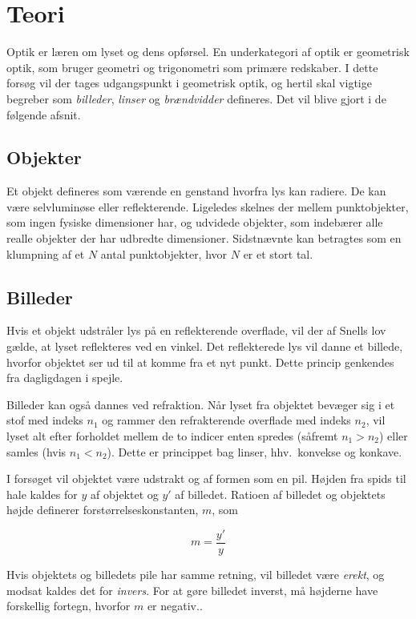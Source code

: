 \section{Teori}
Optik er læren om lyset og dens opførsel. En underkategori af optik er geometrisk optik, som bruger geometri og trigonometri som primære redskaber. I dette forsøg vil der tages udgangspunkt i geometrisk optik, og hertil skal vigtige begreber som \emph{billeder}, \emph{linser} og \emph{brændvidder} defineres. Det vil blive gjort i de følgende afsnit.

\subsection{Objekter} 
Et objekt defineres som værende en genstand hvorfra lys kan radiere. De kan være selvluminøse eller reflekterende. Ligeledes skelnes der mellem punktobjekter, som ingen fysiske dimensioner har, og udvidede objekter, som indebærer alle realle objekter der har udbredte dimensioner. Sidstnævnte kan betragtes som en klumpning af et $N$ antal punktobjekter, hvor $N$ er et stort tal.


\subsection{Billeder}
Hvis et objekt udstråler lys på en reflekterende overflade, vil der af Snells lov gælde, at lyset reflekteres ved en vinkel. Det reflekterede lys vil danne et billede, hvorfor objektet ser ud til at komme fra et nyt punkt. Dette princip genkendes fra dagligdagen i spejle.

Billeder kan også dannes ved refraktion. Når lyset fra objektet bevæger sig i et stof med indeks $n_1$ og rammer den refrakterende overflade med indeks $n_2$, vil lyset alt efter forholdet mellem de to indicer enten spredes (såfremt $n_1 > n_2$) eller samles (hvis $n_1 < n_2$). Dette er princippet bag linser, hhv.\ konvekse og konkave.


I forsøget vil objektet være udstrakt og af formen som en pil. Højden fra spids til hale kaldes for $y$ af objektet og $y'$ af billedet. Ratioen af billedet og objektets højde definerer forstørrelseskonstanten, $m$, som

\begin{equation}
    m = \frac{y'}{y}
    \label{eq:m}
\end{equation}

Hvis objektets og billedets pile har samme retning, vil billedet være \emph{erekt}, og modsat kaldes det for \emph{invers}. For at gøre billedet inverst, må højderne have forskellig fortegn, hvorfor $m$ er negativ..

